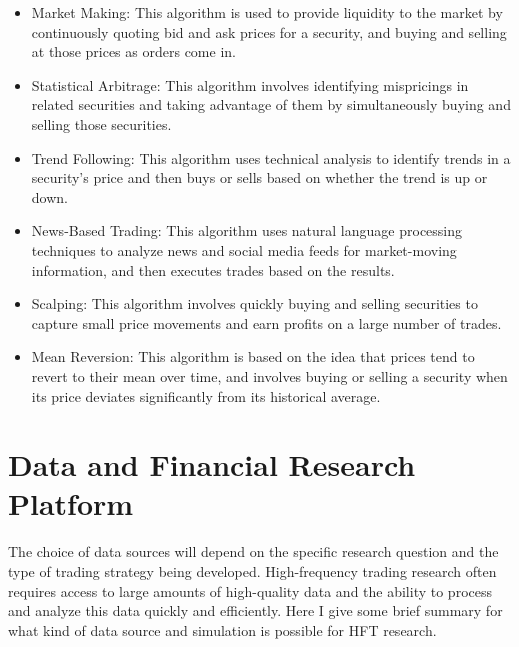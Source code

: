 \documentclass{article}
\begin{document}
\begin{itemize}
	\item Market Making: This algorithm is used to provide liquidity to the market by continuously quoting bid and ask prices for a security, and buying and selling at those prices as orders come in.
	
	\item Statistical Arbitrage: This algorithm involves identifying mispricings in related securities and taking advantage of them by simultaneously buying and selling those securities.
	\item Trend Following: This algorithm uses technical analysis to identify trends in a security's price and then buys or sells based on whether the trend is up or down.
	\item News-Based Trading: This algorithm uses natural language processing techniques to analyze news and social media feeds for market-moving information, and then executes trades based on the results.
	\item Scalping: This algorithm involves quickly buying and selling securities to capture small price movements and earn profits on a large number of trades.
	\item Mean Reversion: This algorithm is based on the idea that prices tend to revert to their mean over time, and involves buying or selling a security when its price deviates significantly from its historical average. \cite{brogaard2014high}
\end{itemize}




\section{Data and Financial Research Platform}
The choice of data sources will depend on the specific research question and the type of trading strategy being developed. High-frequency trading research often requires access to large amounts of high-quality data and the ability to process and analyze this data quickly and efficiently.
Here I give some brief summary for what kind of data source and simulation is possible for HFT research. 
\end{document}
